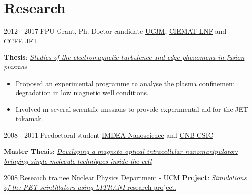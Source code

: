 \documentclass[letterpaper]{twentysecondcv} %
\begin{document}
\section{Research}
\begin{twenty}
	\twentyitem
    	{2012 - 2017}
		{}
        {FPU Grant, Ph. Doctor candidate}
        {\href{https://www.uc3m.es/}{UC3M},  \href{http://www.ciemat.es/}{CIEMAT-LNF} and \href{https://www.euro-fusion.org/devices/jet/}{CCFE-JET}}
        {}
        {
       	\textbf{Thesis}: \href{https://e-archivo.uc3m.es/handle/10016/24978}{\emph{Studies of the electromagnetic turbulence and edge phenomena in fusion plasmas}}
        {\begin{itemize}
        \item Proposed an experimental programme to analyse the plasma confinement degradation in low magnetic well conditions.
        \item Involved in several scientific missions to provide experimental aid for the JET tokamak.
        \vspace{2mm}
		\end{itemize}}
        }
    \twentyitem
        {2008 - 2011}
        {}
        {Predoctoral student}
        {\href{http://nanociencia.imdea.org/}{IMDEA-Nanoscience} and \href{http://www.cnb.csic.es/index.php/es/investigacion/departamentos-de-investigacion/estructura-de-macromoleculas}{CNB-CSIC}}
        {}
        {
        \textbf{Master Thesis}: \href{https://drive.google.com/open?id=1oGQjBpotnNVcit9QcrBaTAIsPuv4H9pz}{\emph{Developing a magneto-optical intracellular nanomanipulator: bringing single-molecule techniques inside the cell}}
        \vspace{2mm}

        }
    \twentyitem
        {2008}
        {}
        {Research trainee}
        {\href{http://nuclear.fis.ucm.es/}{Nuclear Physics Department - UCM}}
        {}
        {
        \textbf{Project}: \href{https://drive.google.com/open?id=1hC6z1AJrOAY0hH-OgYCG0hBnCQOkAaPH}{\emph{Simulations of the PET scintillators using LITRANI} research project.}
        }
\end{twenty}

\end{document}
